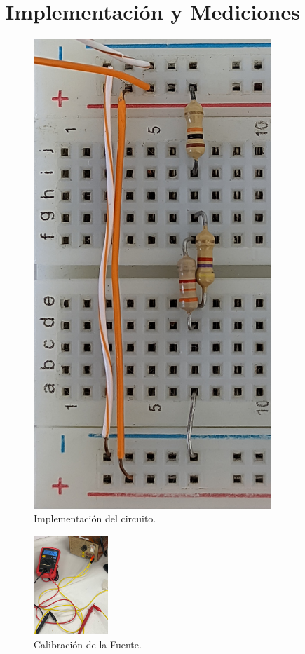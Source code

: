 \documentclass[a4paper,12pt, spanish]{report}
\begin{document}
      \section{Implementación y Mediciones}
      \begin{figure}[!h]
        \centering
        \includegraphics[angle=270, width=0.8\textwidth]{pictures/prot-crkt.jpg}
        \caption{Implementación del circuito.}
        \label{prot-crkt}
      \end{figure}
      \begin{figure}
        \vspace{-0.3cm}
        \centering
        \includegraphics[width=0.25\textwidth]{pictures/mult-vs.jpeg}
        \caption{Calibración de la Fuente.}
        \label{mult-vs}
      \end{figure}
\end{document}
